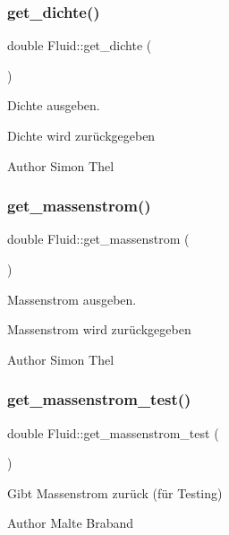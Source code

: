 \subsubsection{\texorpdfstring{get\+\_\+dichte()}{get\_dichte()}}
{\footnotesize\ttfamily double Fluid\+::get\+\_\+dichte (\begin{DoxyParamCaption}{ }\end{DoxyParamCaption})}



Dichte ausgeben. 

Dichte wird zurückgegeben \begin{DoxyAuthor}{Author}
Simon Thel 
\end{DoxyAuthor}
\mbox{\label{class_fluid_afd9451c48ea66d15fdb8226da58da28e}} 
\subsubsection{\texorpdfstring{get\+\_\+massenstrom()}{get\_massenstrom()}}
{\footnotesize\ttfamily double Fluid\+::get\+\_\+massenstrom (\begin{DoxyParamCaption}{ }\end{DoxyParamCaption})}



Massenstrom ausgeben. 

Massenstrom wird zurückgegeben \begin{DoxyAuthor}{Author}
Simon Thel 
\end{DoxyAuthor}
\mbox{\label{class_fluid_ac30c9c13d0bc8094ff28dad837c4eb81}} 
\subsubsection{\texorpdfstring{get\+\_\+massenstrom\+\_\+test()}{get\_massenstrom\_test()}}
{\footnotesize\ttfamily double Fluid\+::get\+\_\+massenstrom\+\_\+test (\begin{DoxyParamCaption}{ }\end{DoxyParamCaption})}

Gibt Massenstrom zurück (für Testing) \begin{DoxyAuthor}{Author}
Malte Braband 
\end{DoxyAuthor}
\mbox{\label{class_fluid_a80d39a71b73f5ac4cffcaceb61b9e0ee}} 
